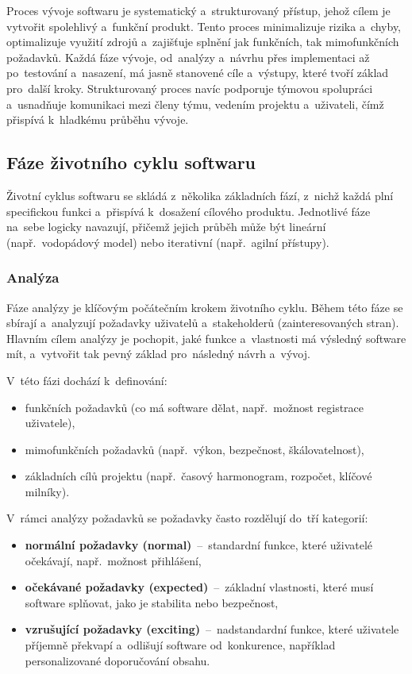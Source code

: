 \documentclass[male,czech,api_bc]{kitheses}
\begin{document}
Proces vývoje softwaru je systematický a~strukturovaný přístup, jehož cílem je vytvořit spolehlivý a~funkční produkt. Tento proces minimalizuje rizika a~chyby, optimalizuje využití zdrojů a~zajišťuje splnění jak funkčních, tak mimofunkčních požadavků. Každá fáze vývoje, od~analýzy a~návrhu přes implementaci až po~testování a~nasazení, má jasně stanovené cíle a~výstupy, které tvoří základ pro~další kroky. Strukturovaný proces navíc podporuje týmovou spolupráci a~usnadňuje komunikaci mezi členy týmu, vedením projektu a~uživateli, čímž přispívá k~hladkému průběhu vývoje.

\subsection{Fáze životního cyklu softwaru}

Životní cyklus softwaru se skládá z~několika základních fází, z~nichž každá plní specifickou funkci a~přispívá k~dosažení cílového produktu. Jednotlivé fáze na~sebe logicky navazují, přičemž jejich průběh může být lineární (např.~vodopádový model) nebo iterativní (např.~agilní přístupy).

\subsubsection{Analýza}

Fáze analýzy je klíčovým počátečním krokem životního cyklu. Během této fáze se sbírají a~analyzují požadavky uživatelů a~stakeholderů (zainteresovaných stran). Hlavním cílem analýzy je pochopit, jaké funkce a~vlastnosti má výsledný software mít, a~vytvořit tak pevný základ pro~následný návrh a~vývoj.

V~této fázi dochází k~definování:
\begin{itemize}
	\item funkčních požadavků (co má software dělat, např.~možnost registrace uživatele),
	\item mimofunkčních požadavků (např.~výkon, bezpečnost, škálovatelnost),
	\item základních cílů projektu (např.~časový harmonogram, rozpočet, klíčové milníky).
\end{itemize}

V~rámci analýzy požadavků se požadavky často rozdělují do~tří kategorií:
\begin{itemize}
	\item \textbf{normální požadavky (normal)}~--~standardní funkce, které uživatelé očekávají, např.~možnost přihlášení,
	\item \textbf{očekávané požadavky (expected)}~--~základní vlastnosti, které musí software splňovat, jako je stabilita nebo bezpečnost,
	\item \textbf{vzrušující požadavky (exciting)}~--~nadstandardní funkce, které uživatele příjemně překvapí a~odlišují software od~konkurence, například personalizované doporučování obsahu.
\end{itemize}
\end{document}
